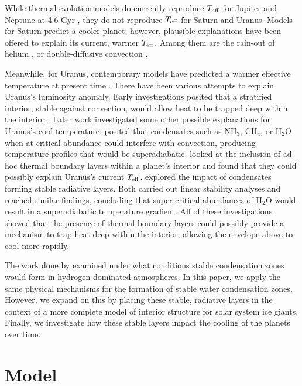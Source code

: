 \documentclass[11pt]{ucscthesisbs}
\begin{document}
\renewcommand{\arraystretch}{1}
While thermal evolution models do currently reproduce $T_{\rm eff}$ for Jupiter and Neptune at 4.6 Gyr \citep{graboske_1975,fortney_2011}, they do not reproduce $T_{\rm eff}$ for Saturn and Uranus. Models for Saturn predict a cooler planet; however, plausible explanations have been offered to explain its current, warmer $T_{\rm eff}$. Among them are the rain-out of helium \citep{fortney_hubbard_2003, 2020ApJ...889...51M}, or double-diffusive convection \citep{leconte_chabrier_2013}. 

Meanwhile, for Uranus, contemporary models have predicted a warmer effective temperature at present time \citep{fortney_2011, podolak_1991, hubbard_1995, 2019A&A...632A..70S}. There have been various attempts to explain Uranus's luminosity anomaly. Early investigations posited that a stratified interior, stable against convection, would allow heat to be trapped deep within the interior \citep{podolak_1991}. Later work investigated some other possible explanations for Uranus's cool temperature. \citep{guillot_1995} posited that condensates such as NH$_{3}$, CH$_{4}$, or H$_{2}$O when at critical abundance could interfere with convection, producing temperature profiles that would be superadiabatic. \citep{nettelmann_2016} looked at the inclusion of ad-hoc thermal boundary layers within a planet's interior and found that they could possibly explain Uranus's current $T_{\rm eff}$. \citep{friedson_2017,leconte_2017} explored the impact of condensates forming stable radiative layers. Both carried out linear stability analyses and reached similar findings, concluding that super-critical abundances of H$_{2}$O would result in a superadiabatic temperature gradient. All of these investigations showed that the presence of thermal boundary layers could possibly provide a mechanism to trap heat deep within the interior, allowing the envelope above to cool more rapidly.

The work done by \citep{guillot_1995,friedson_2017,leconte_2017} examined under what conditions stable condensation zones would form in hydrogen dominated atmospheres. In this paper, we apply the same physical mechanisms for the formation of stable water condensation zones. However, we expand on this by placing these stable, radiative layers in the context of a more complete model of interior structure for solar system ice giants. Finally, we investigate how these stable layers impact the cooling of the planets over time. 
 

\chapter{Model}
\end{document}
